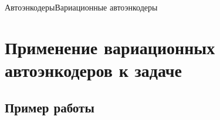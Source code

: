 \documentclass{beamer}
\begin{document}
\begin{frame}{Автоэнкодеры}{Вариационные автоэнкодеры}

\begin{figure}[h]
	\label{fig:vae}
\end{figure}

\end{frame}

\section{Применение вариационных автоэнкодеров к задаче}

\subsection{Пример работы}
\end{document}

